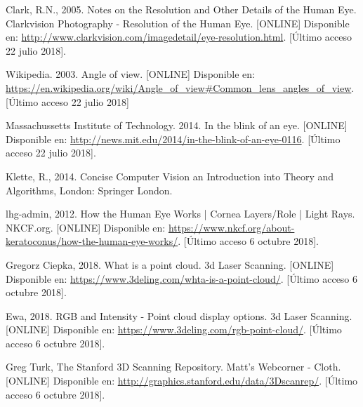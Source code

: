 \begin{thebibliography}{99}
 Clark, R.N., 2005. Notes on the Resolution and Other Details of the Human Eye. Clarkvision Photography - Resolution of the Human Eye. [ONLINE] Disponible en: \url{http://www.clarkvision.com/imagedetail/eye-resolution.html}. [Último acceso 22 julio 2018].

 Wikipedia. 2003. Angle of view. [ONLINE] Disponible en: \url{https://en.wikipedia.org/wiki/Angle_of_view#Common_lens_angles_of_view}. [Último acceso 22 julio 2018]

 Massachussetts Institute of Technology. 2014. In the blink of an eye. [ONLINE] Disponible en: \url{http://news.mit.edu/2014/in-the-blink-of-an-eye-0116}. [Último acceso 22 julio 2018].



 Klette, R., 2014. Concise Computer Vision an Introduction into Theory and Algorithms, London: Springer London.

 lhg-admin, 2012. How the Human Eye Works | Cornea Layers/Role | Light Rays. NKCF.org. [ONLINE] Disponible en: \url{https://www.nkcf.org/about-keratoconus/how-the-human-eye-works/}. [Último acceso 6 octubre 2018].


 Gregorz Ciepka, 2018. What is a point cloud. 3d Laser Scanning. [ONLINE] Disponible en: \url{https://www.3deling.com/whta-is-a-point-cloud/}. [Último acceso 6 octubre 2018].


 Ewa, 2018. RGB and Intensity - Point cloud display options. 3d Laser Scanning. [ONLINE] Disponible en: \url{https://www.3deling.com/rgb-point-cloud/}. [Último acceso 6 octubre 2018].

 

 Greg Turk, The Stanford 3D Scanning Repository. Matt's Webcorner - Cloth. [ONLINE] Disponible en: \url{http://graphics.stanford.edu/data/3Dscanrep/}. [Último acceso 6 octubre 2018].



\end{thebibliography}
